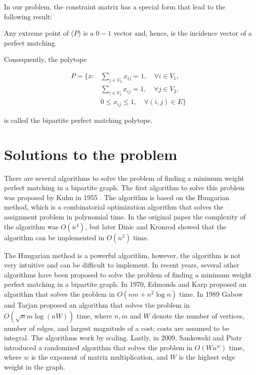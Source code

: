 In our problem, the constraint matrix has a special form that lead to the following result: 

\begin{teorema}
    Any extreme point of ($P$) is a $0-1$ vector and, hence, is the incidence vector of a perfect matching.
\end{teorema}

Consequently, the polytope

\begin{equation}
    \begin{aligned}
        P = \{ x: & \sum_{j \in V_2} x_{ij} = 1, \quad \forall i \in V_1, \\
        & \sum_{i \in V_1} x_{ij} = 1, \quad \forall j \in V_2, \\
        & 0 \leq x_{ij} \leq 1, \quad \forall (i, j) \in E \}
    \end{aligned}
\end{equation}

is called the bipartite perfect matching polytope. 

\section{Solutions to the problem}
There are several algorithms to solve the problem of finding a minimum weight perfect matching in a bipartite graph. The first algorithm to solve this problem was proposed by Kuhn in 1955 \cite{kuhn1955hungarian}. The algorithm is based on the Hungarian method, which is a combinatorial optimization algorithm that solves the assignment problem in polynomial time. In the original paper the complexity of the algorithm was $O(n^4)$, but later Dinic and Kronrod \cite{dinic1969algorithm} showed that the algorithm can be implemented in $O(n^3)$ time.

The Hungarian method is a powerful algorithm, however, the algorithm is not very intuitive and can be difficult to implement. In recent years, several other algorithms have been proposed to solve the problem of finding a minimum weight perfect matching in a bipartite graph. In 1970, Edmonds and Karp \cite{edmonds1972theoretical} proposed an algorithm that solves the problem in $O(nm + n^2 \log n)$ time. In 1989 Gabow and Tarjan \cite{gabow1989faster} proposed an algorithm that solves the problem in $O(\sqrt{n}m \log(nW))$ time,  where $n,m$ and $W$ denote the number of vertices, number of edges, and largest magnitude of a cost; costs are assumed to be integral. The algorithms work by scaling. Lastly, in 2009, Sankowski and Piotr \cite{sankowski2009maximum} introduced a randomized algorithm that solves the problem in $O(Wn^w)$ time, where $w$ is the exponent of matrix multiplication, and $W$ is the highest edge weight in the graph.

